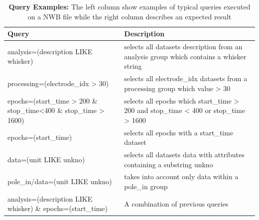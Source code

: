 \documentclass[utf8]{frontiersSCNS} %
\begin{document}
\begin{table}
\caption{\textbf{Query Examples:} The left column show examples of typical queries executed on a NWB file while the right column describes an expected result}
\label{tab:query-examples}       %

\begin{tabular}{ |p{7.3cm}|p{9.5cm}| }
\hline
	 \textbf{Query}                                  &       \textbf{Description} \\ \hline
	
	 analysis=(description LIKE whisker)  &  selects all datasets description from an analysis group which contains a whisker string  \\ \hline
	 processing=(electrode\_idx > 30)        &  selects all electrode\_idx datasets from a processing group which value > 30   \\ \hline
	 epochs=(start\_time > 200 \& stop\_time<400 \& stop\_time > 1600)  &  selects all epochs which start\_time > 200 and stop\_time < 400 or stop\_time > 1600 \\ \hline
	 epochs=(start\_time)                     &  selects all epochs with a start\_time dataset         \\ \hline
	 data=(unit LIKE unkno)  &  selects all datasets data with attributes containing a substring unkno \\ \hline
	 pole\_in/data=(unit LIKE unkno)  &  takes into account only data within a pole\_in group \\ \hline
	 analysis=(description LIKE whisker) \& epochs=(start\_time)   &  A combination of previous queries \\ \hline

\end{tabular}

\end{table}
\end{document}
